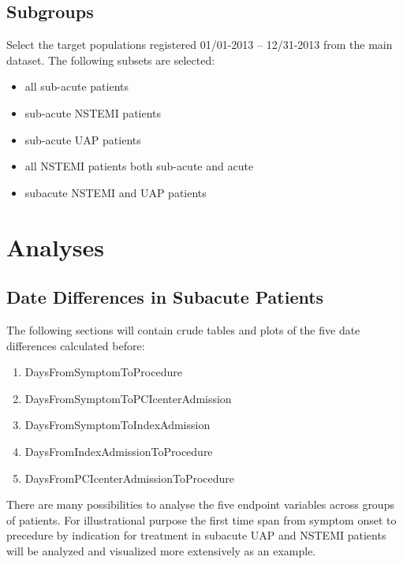 \documentclass[presentation,xcolor=pdftex,dvipsnames,table,11pt]{beamer}
\begin{document}
\begin{tiny}
\begin{frame}
\end{frame}








\section{Subgroups}
\begin{frame}
Select the target populations registered 01/01-2013 -- 12/31-2013 from the main dataset. The following subsets are selected:
\begin{itemize}
\item{all sub-acute patients}  
\item{sub-acute NSTEMI patients}  
\item{sub-acute UAP patients}  
\item{all NSTEMI patients both sub-acute and acute}  
\item{subacute NSTEMI and UAP patients}
\end{itemize}
\end{frame}






\chapter{Analyses}


\section{Date Differences in Subacute Patients}

\begin{frame}
The following sections will contain crude tables and plots of the five date differences calculated before:
\begin{enumerate}
\item{DaysFromSymptomToProcedure}
\item{DaysFromSymptomToPCIcenterAdmission}
\item{DaysFromSymptomToIndexAdmission}
\item{DaysFromIndexAdmissionToProcedure}
\item{DaysFromPCIcenterAdmissionToProcedure}
\end{enumerate}
\end{frame}

\begin{frame}
There are many possibilities to analyse the five endpoint variables across groups of patients. For illustrational purpose the first time span from symptom onset to precedure by indication for treatment in subacute UAP and NSTEMI patients will be analyzed and visualized more extensively as an example.
\end{frame}



\end{tiny}
\end{document}
